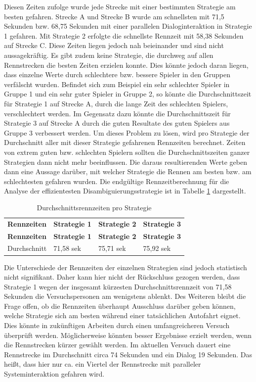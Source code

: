 \documentclass[12pt,a4paper]{scrartcl}
\begin{document}
Diesen Zeiten zufolge wurde jede Strecke mit einer bestimmten Strategie am besten gefahren. Strecke A  und Strecke B wurde am schnellsten mit 71,5 Sekunden bzw. 68,75 Sekunden mit einer parallelen Dialoginteraktion in Strategie 1 gefahren. Mit Strategie 2 erfolgte die schnellste Rennzeit mit 58,38 Sekunden auf Strecke C. Diese Zeiten liegen jedoch nah beieinander und sind nicht aussagekräftig. Es gibt zudem keine Strategie, die durchweg auf allen Rennstrecken die besten Zeiten erzielen konnte. Dies könnte jedoch daran liegen, dass einzelne Werte durch schlechtere bzw. bessere Spieler in den Gruppen verfälscht wurden.
Befindet sich zum Beispiel ein sehr schlechter Spieler in Gruppe 1 und ein sehr guter Spieler in Gruppe 2, so könnte die Durchschnittszeit für Strategie 1 auf Strecke A, durch die lange Zeit des schlechten Spielers, verschlechtert werden. Im Gegensatz dazu könnte die Durchschnittszeit für Strategie 3 auf Strecke A durch die guten Resultate des guten Spielers aus Gruppe 3 verbessert werden. Um dieses Problem zu lösen, wird pro Strategie der Durchschnitt aller mit dieser Strategie gefahrenen Rennzeiten berechnet. Zeiten von extrem guten bzw. schlechten Spielern sollten die Durchschnittszeiten ganzer Strategien dann nicht mehr beeinflussen. Die daraus resultierenden Werte geben dann eine Aussage darüber, mit welcher Strategie die Rennen am besten bzw. am schlechtesten gefahren wurden. 
Die endgültige Rennzeitberechnung für die Analyse der effizientesten Disambiguierungsstrategie ist in Tabelle \ref{RennZeitenDis1} dargestellt.

\begin{longtable}{p{3cm}p{3cm}p{3cm}p{3cm} }
	\label{RennZeitenDis1}\\
	\caption[Durchschnittsrennzeiten pro Strategie]{Durchschnittsrennzeiten pro Strategie}\\
	\hline
	\textbf{Rennzeiten}&\textbf{Strategie 1}&\textbf{Strategie 2} &\textbf{Strategie 3}\\
	\hline
	\endfirsthead
	\hline
	\textbf{Rennzeiten}&\textbf{Strategie 1}&\textbf{Strategie 2} &\textbf{Strategie 3}\\
	\hline
	\endhead
Durchschnitt & 71,58 sek & 75,71 sek & 75,92 sek\\
\hline
\end{longtable}
Die Unterschiede der Rennzeiten der einzelnen Strategien sind jedoch statistisch nicht signifikant. Daher kann hier nicht der Rückschluss gezogen werden, dass Strategie 1 wegen der insgesamt kürzesten Durchschnittsrennzeit von 71,58 Sekunden die Versuchspersonen am wenigstens ablenkt. Des Weiteren bleibt die Frage offen, ob die Rennzeiten überhaupt Ausschluss darüber geben können, welche Strategie sich am besten während einer tatsächlichen Autofahrt eignet. Dies könnte in zukünftigen Arbeiten durch einen umfangreicheren Versuch überprüft werden. Möglicherweise könnten besser Ergebnisse erzielt werden, wenn die Rennstrecken kürzer gewählt werden. Im aktuellen Versuch dauert eine Rennstrecke im Durchschnitt circa 74 Sekunden und ein Dialog 19 Sekunden. Das heißt, dass hier nur ca. ein Viertel der Rennstrecke mit paralleler Systeminteraktion gefahren wird.
\end{document}
